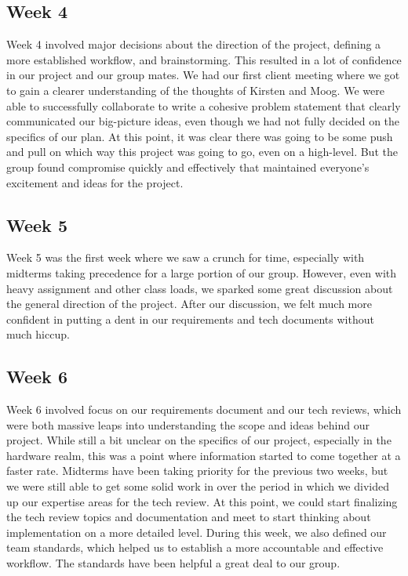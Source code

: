     \subsection{Week 4}
        Week 4 involved major decisions about the direction of the project, defining a more established workflow, and brainstorming.
        This resulted in a lot of confidence in our project and our group mates.
        We had our first client meeting where we got to gain a clearer understanding of the thoughts of Kirsten and Moog.
        We were able to successfully collaborate to write a cohesive problem statement that clearly communicated our big-picture ideas, even though we had not fully decided on the specifics of our plan.
        At this point, it was clear there was going to be some push and pull on which way this project was going to go, even on a high-level.
        But the group found compromise quickly and effectively that maintained everyone’s excitement and ideas for the project. 
    \subsection{Week 5}
        Week 5 was the first week where we saw a crunch for time, especially with midterms taking precedence for a large portion of our group.
        However, even with heavy assignment and other class loads, we sparked some great discussion about the general direction of the project.
        After our discussion, we felt much more confident in putting a dent in our requirements and tech documents without much hiccup.
    \subsection{Week 6}
        Week 6 involved focus on our requirements document and our tech reviews, which were both massive leaps into understanding the scope and ideas behind our project.
        While still a bit unclear on the specifics of our project, especially in the hardware realm, this was a point where information started to come together at a faster rate.
        Midterms have been taking priority for the previous two weeks, but we were still able to get some solid work in over the period in which we divided up our expertise areas for the tech review.
        At this point, we could start finalizing the tech review topics and documentation and meet to start thinking about implementation on a more detailed level.
        During this week, we also defined our team standards, which helped us to establish a more accountable and effective workflow. The standards have been helpful a great deal to our group. 
